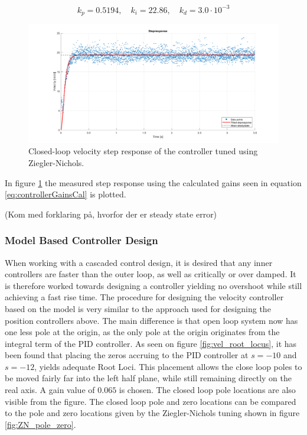 \documentclass[../../main.tex]{subfiles}
\begin{document}
\begin{equation}
    k_p = 0.5194, \quad k_i = 22.86, \quad k_d = 3.0 \cdot 10^{-3}
    \label{eq:controllerGainsCal}
\end{equation}


\begin{figure}
    \centering
    \includegraphics[width = 1\textwidth]{Sections/System_Design/Images/Step_Implemented_NZ.png}
    \caption{Closed-loop velocity step response of the controller tuned using Ziegler-Nichols.}
    \label{fig:NZ_implemented}
\end{figure}


In figure \ref{fig:NZ_implemented} the measured step response using the calculated gains seen in equation \ref{eq:controllerGainsCal} is plotted. 

(Kom med forklaring på, hvorfor der er steady state error)

\subsubsection{Model Based Controller Design}
When working with a cascaded control design, it is desired that any inner controllers are faster than the outer loop, as well as critically or over damped. It is therefore worked towards designing a controller yielding no overshoot while still achieving a fast rise time.
The procedure for designing the velocity controller based on the model is very similar to the approach used for designing the position controllers above. The main difference is that open loop system now has one less pole at the origin, as the only pole at the origin originates from the integral term of the PID controller. As seen on figure \ref{fig:vel_root_locus}, it has been found that placing the zeros accruing to the PID controller at $s = -10$ and $s = -12$, yields adequate Root Loci. This placement allows the close loop poles to be moved fairly far into the left half plane, while still remaining directly on the real axis. A gain value of $0.065$ is chosen. The closed loop pole locations are also visible from the figure. The closed loop pole and zero locations can be compared to the pole and zero locations given by the Ziegler-Nichols tuning shown in figure \ref{fig:ZN_pole_zero}.
\end{document}
